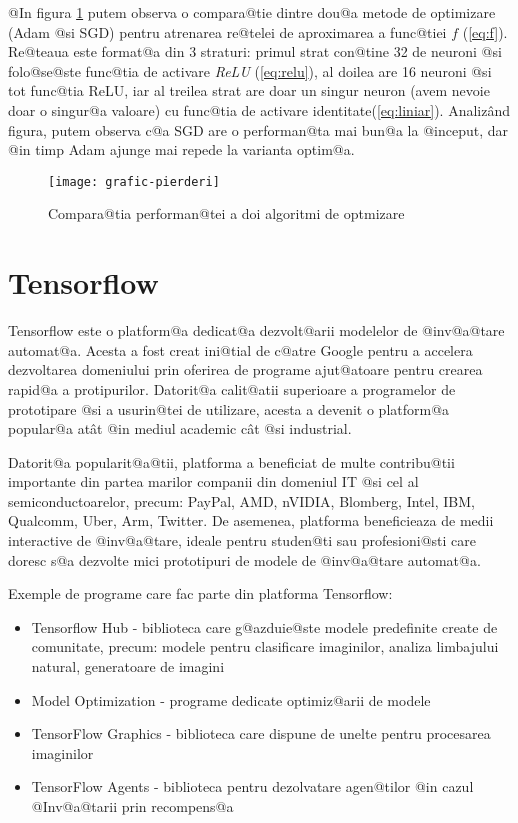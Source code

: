 @In figura \ref{fig:grafic-pierderi} putem observa o compara@tie dintre dou@a metode de optimizare (Adam @si SGD) pentru atrenarea re@telei de aproximarea a func@tiei $f$ (\ref{eq:f}). Re@teaua este format@a din 3 straturi: primul strat con@tine 32 de neuroni @si folo@se@ste func@tia de activare \textsl{ReLU} (\ref{eq:relu}), al doilea are 16 neuroni @si tot func@tia ReLU, iar al treilea strat are doar un singur neuron (avem nevoie doar o singur@a valoare) cu func@tia de activare identitate(\ref{eq:liniar}). Analiz\^ and figura, putem observa c@a SGD are o performan@ta mai bun@a la @inceput, dar @in timp Adam ajunge mai repede la varianta optim@a.

\begin{figure}[h]
	\centering
	\texttt{[image: grafic-pierderi]}
	\caption{Compara@tia performan@tei a doi algoritmi de optmizare}
	\label{fig:grafic-pierderi}
\end{figure}

\section{Tensorflow}
Tensorflow este o platform@a dedicat@a dezvolt@arii modelelor de @inv@a@tare automat@a. Acesta a fost creat ini@tial de c@atre Google pentru a accelera dezvoltarea domeniului prin oferirea de programe ajut@atoare pentru crearea rapid@a a protipurilor. Datorit@a calit@atii superioare a programelor de prototipare @si a usurin@tei de utilizare, acesta a devenit o platform@a popular@a at\^ at @in mediul academic c\^ at @si industrial.

Datorit@a popularit@a@tii, platforma a beneficiat de multe contribu@tii importante din partea marilor companii din domeniul IT @si cel al semiconductoarelor, precum: PayPal, AMD, nVIDIA, Blomberg, Intel, IBM, Qualcomm, Uber, Arm, Twitter. De asemenea, platforma beneficieaza de medii interactive de @inv@a@tare, ideale pentru studen@ti sau profesioni@sti care doresc s@a dezvolte mici prototipuri de modele de @inv@a@tare automat@a.

Exemple de programe care fac parte din platforma Tensorflow:
\begin{itemize}
	\item Tensorflow Hub - biblioteca care g@azduie@ste modele predefinite create de comunitate, precum: modele pentru clasificare imaginilor, analiza limbajului natural, generatoare de imagini
	\item Model Optimization - programe dedicate optimiz@arii de modele
	\item TensorFlow Graphics - biblioteca care dispune de unelte pentru procesarea imaginilor
	\item TensorFlow Agents - biblioteca pentru dezolvatare agen@tilor @in cazul @Inv@a@tarii prin recompens@a
\end{itemize}

